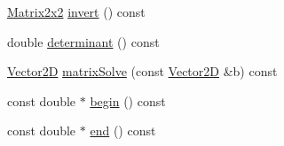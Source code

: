 \begin{DoxyCompactItemize}
\item 
\hyperlink{class_matrix2x2}{Matrix2x2} \hyperlink{class_matrix2x2_a5c4d3f6f5ba43791cad0fd210886c0d6}{invert} () const 
\item 
double \hyperlink{class_matrix2x2_a4498d52afa9436548e98105ac39f995a}{determinant} () const 
\item 
\hyperlink{class_vector2_d}{Vector2\-D} \hyperlink{class_matrix2x2_aa0c530a9fe1db1065a39af880ddbaca9}{matrix\-Solve} (const \hyperlink{class_vector2_d}{Vector2\-D} \&b) const 
\item 
const double $\ast$ \hyperlink{class_matrix2x2_a7bdbb1745aae6fa25060c9db113f0fea}{begin} () const 
\item 
const double $\ast$ \hyperlink{class_matrix2x2_a763a2edfa907e05301e46f8864921bfe}{end} () const 
\end{DoxyCompactItemize}


